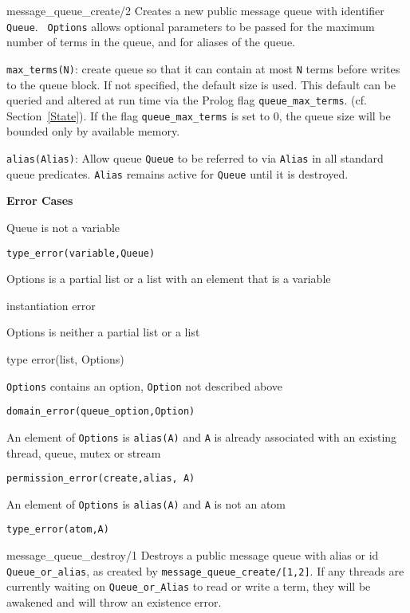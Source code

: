 \begin{description}
{message\_queue\_create/2}
%
Creates a new public message queue with identifier {\tt Queue}.  {\tt
  Options} allows optional parameters to be passed for the maximum
number of terms in the queue, and for aliases of the queue.
%
\bi
\item {\tt max\_terms(N)}: create queue so that it can contain at most
  {\tt N} terms before writes to the queue block.  If not specified,
  the default size is used.  This default can be queried and altered
  at run time via the Prolog flag {\tt queue\_max\_terms}.
  (cf. Section~\ref{State}).  If the flag {\tt queue\_max\_terms} is
  set to 0, the queue size will be bounded only by available memory.
%
\item {\tt alias(Alias)}: Allow queue {\tt Queue} to be referred to
  via {\tt Alias} in all standard queue predicates.  {\tt Alias}
  remains active for {\tt Queue} until it is destroyed.
\ei

{\bf Error Cases}
\bi
\item 	Queue is not a variable
\bi
\item 	{\tt type\_error(variable,Queue)}
\ei
\item Options is a partial list or a list with an element that is a
  variable 
\bi
\item  instantiation error
\ei
\item Options is neither a partial list or a list
\bi
\item  type error(list, Options)
\ei
\item 	{\tt Options} contains an option, {\tt Option} not described above
\bi
\item 	{\tt domain\_error(queue\_option,Option)}
\ei
%
\item An element of {\tt Options} is {\tt alias(A)} and {\tt A} is
  already associated with an existing thread, queue, mutex or stream 
\bi
\item {\tt permission\_error(create,alias, A)}
\ei
\item An element of {\tt Options} is {\tt alias(A)} and {\tt A} is not an atom
\bi
\item {\tt type\_error(atom,A)}
\ei
\ei

{message\_queue\_destroy/1}
%
Destroys a public message queue with alias or id {\tt
  Queue\_or\_alias}, as created by {\tt message\_queue\_create/[1,2]}.
If any threads are currently waiting on {\tt Queue\_or\_Alias} to read
or write a term, they will be awakened and will throw an existence
error.


\end{description}
